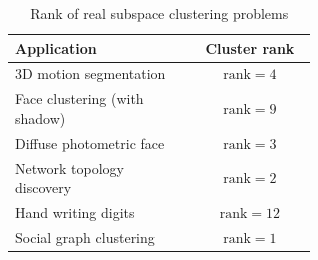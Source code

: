 \documentclass[twoside,11pt]{article}
\numberwithin{equation}{section}
\begin{document}



%



\begin{table}
  \centering
 \begin{tabular}{|p{0.6\linewidth}|c|}
   \hline
   \textbf{Application} & \textbf{Cluster rank}\\
   \hline
   3D motion segmentation \citep{costeira1998motion_seg} & $\mathrm{rank}=4$ \\\hline
   Face clustering (with shadow) \citep{basri2003lambertianface} & $\mathrm{rank}=9$ \\\hline
   Diffuse photometric face \citep{zhou2007PhotometricFace}& $\mathrm{rank}=3$ \\\hline
   Network topology discovery \citep{eriksson2011high_rankMC} & $\mathrm{rank}=2$ \\\hline
   Hand writing digits \citep{hastie1998MNIST}&  $\mathrm{rank}=12$\\\hline
   Social graph clustering \citep{xu2011graphclustering}& $\mathrm{rank}=1$ \\
   \hline
 \end{tabular}
  \caption{Rank of real subspace clustering problems}\label{tab:low_rank}
\end{table}

\end{document}
